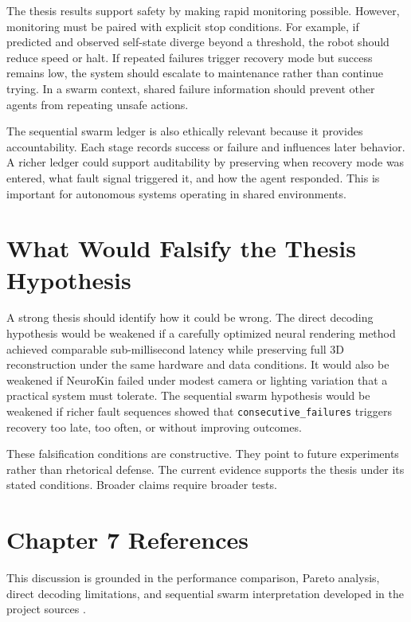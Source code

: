 \documentclass[12pt,a4paper,oneside]{report}
\begin{document}
The thesis results support safety by making rapid monitoring possible. However, monitoring must be paired with explicit stop conditions. For example, if predicted and observed self-state diverge beyond a threshold, the robot should reduce speed or halt. If repeated failures trigger recovery mode but success remains low, the system should escalate to maintenance rather than continue trying. In a swarm context, shared failure information should prevent other agents from repeating unsafe actions.

The sequential swarm ledger is also ethically relevant because it provides accountability. Each stage records success or failure and influences later behavior. A richer ledger could support auditability by preserving when recovery mode was entered, what fault signal triggered it, and how the agent responded. This is important for autonomous systems operating in shared environments.

\section{What Would Falsify the Thesis Hypothesis}

A strong thesis should identify how it could be wrong. The direct decoding hypothesis would be weakened if a carefully optimized neural rendering method achieved comparable sub-millisecond latency while preserving full 3D reconstruction under the same hardware and data conditions. It would also be weakened if NeuroKin failed under modest camera or lighting variation that a practical system must tolerate. The sequential swarm hypothesis would be weakened if richer fault sequences showed that \texttt{consecutive\_failures} triggers recovery too late, too often, or without improving outcomes.

These falsification conditions are constructive. They point to future experiments rather than rhetorical defense. The current evidence supports the thesis under its stated conditions. Broader claims require broader tests.

\section*{Chapter 7 References}

This discussion is grounded in the performance comparison, Pareto analysis, direct decoding limitations, and sequential swarm interpretation developed in the project sources \cite{mildenhall2020nerf,kerbl20233d,hu2024teaching,hu2025learning}.
\end{document}
